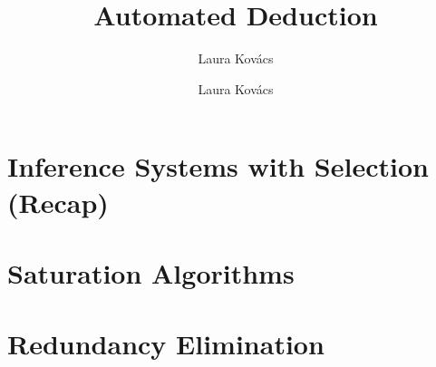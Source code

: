 \documentclass[10pt]{beamer}
\author{
  \textcolor{red!90!black}{Laura Kov\'acs}}
\title{
              	       Automated Deduction
}
\author{
  \textcolor{red!90!black}{Laura Kov\'acs} \\
\titlegraphic{\hspace*{1em}\texttt{[image: forsyte]}}}
\begin{document}
\date{}
\frame{\titlepage}

\section{Inference Systems with Selection (Recap)}


\section{Saturation Algorithms}



\section{Redundancy Elimination}

\end{document}
